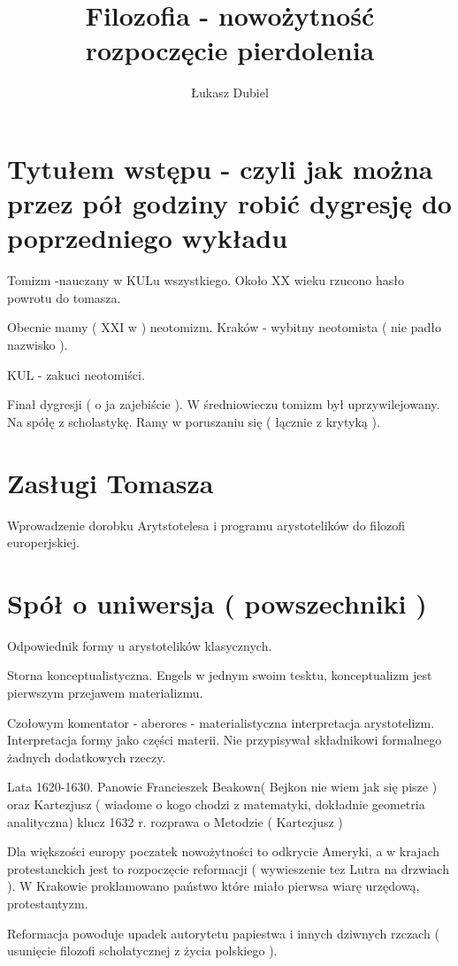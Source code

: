\documentclass[11pt]{article}
\author{Łukasz Dubiel}
\title{Filozofia - nowożytność \\ rozpoczęcie pierdolenia}
\begin{document}
\maketitle

\section{Tytułem wstępu - czyli jak można przez pół godziny robić dygresję do poprzedniego wykładu}
Tomizm -nauczany w KULu wszystkiego.
Około XX wieku rzucono hasło powrotu do tomasza.

Obecnie mamy ( XXI w ) neotomizm.
Kraków - wybitny neotomista ( nie padło nazwisko ).

KUL - zakuci neotomiści. 

Finał dygresji ( o ja zajebiście ).
W średniowieczu tomizm był uprzywilejowany. Na spółę z scholastykę. Ramy w poruszaniu się ( łącznie z krytyką ).
\section{Zasługi Tomasza}
Wprowadzenie dorobku Arytstotelesa i programu arystotelików do filozofi europerjskiej.

\section{Spół o uniwersja ( powszechniki )}
Odpowiednik formy u arystotelików klasycznych.

Storna konceptualistyczna. Engels w jednym swoim tesktu, konceptualizm jest pierwszym przejawem materializmu.

Czołowym komentator - aberores - materialistyczna interpretacja arystotelizm. Interpretacja formy jako części materii. Nie przypisywał składnikowi formalnego żadnych dodatkowych rzeczy.

Lata 1620-1630.
Panowie Francieszek Beakown( Bejkon nie wiem jak się pisze ) oraz Kartezjusz ( wiadome o kogo chodzi z matematyki, dokładnie geometria analityczna) klucz 1632 r. rozprawa o Metodzie ( Kartezjusz )

Dla większości europy poczatek nowożytności to odkrycie Ameryki, a w krajach protestanckich jest to rozpoczęcie reformacji ( wywieszenie tez Lutra na drzwiach ). W Krakowie proklamowano państwo które miało pierwsa wiarę urzędową, protestantyzm.

Reformacja powoduje upadek autorytetu papiestwa i innych dziwnych rzczach ( usunięcie filozofi scholatycznej z życia polskiego ). 
\end{document}
